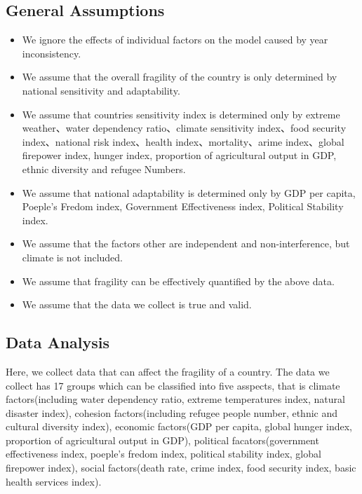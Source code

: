 \documentclass{mcmthesis}
\begin{document}
\subsection{General Assumptions}
\begin{itemize}
  \item We ignore the effects of individual factors on the model caused by year inconsistency.
  \item We assume that the overall fragility of the country is only determined by national sensitivity and adaptability.
  \item We assume that countries sensitivity index is determined only by extreme weather、water dependency ratio、climate sensitivity index、food security index、national risk index、health index、mortality、arime index、global firepower index, hunger index,  proportion of agricultural output in GDP, ethnic diversity and refugee Numbers.
  \item We assume that national adaptability is determined only by GDP per capita, Poeple's Fredom index, Government Effectiveness index, Political Stability index.
  \item We assume that the factors other are independent and non-interference, but climate is not included.
  \item We assume that fragility can be effectively quantified by the above data.
  \item We assume that the data we collect is true and valid.
\end{itemize}
\subsection{Data Analysis}
Here, we collect data that can affect the fragility of a country. The data we collect has 
17 groups which can be classified into five asspects, that is climate factors(including water 
dependency ratio, extreme temperatures index, natural disaster index), cohesion factors(including 
refugee people number, ethnic and cultural diversity index), economic factors(GDP per capita, global 
hunger index, proportion of agricultural output in GDP), political facators(government effectiveness 
index, poeple's fredom index, political stability index, global firepower index), social factors(death 
rate, crime index, food security index, basic health services index).
\end{document}
